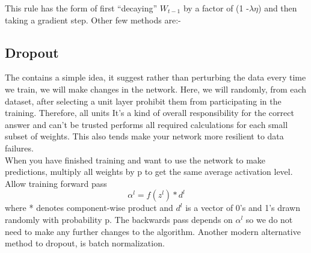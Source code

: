 This rule has the form of first “decaying” $W_{t-1}$ by a factor of (1 -$\lambda \eta$) and then taking a gradient step.
Other few methods are:-



\subsection{Dropout}
The contains a simple idea, it suggest rather than perturbing the data every time we train, we will make changes in the
network. Here, we will randomly, from each dataset, after selecting a unit layer prohibit them from participating  in the training. Therefore, all  units It's a  kind of overall responsibility for  the correct answer  and can't be trusted performs all required calculations for each small subset of weights. This also tends make your network more resilient to data failures\cite{JMLR:v15:srivastava14a}.\\
When you have finished training and want to use the network to make predictions,  multiply all weights by p to get the same average activation level. Allow training forward pass\\
\begin{equation}
    \alpha^l = f(z^l) * d^l
\end{equation}
where * denotes component-wise product and $d^l$ is a vector of 0’s and 1’s drawn randomly
with probability p. The backwards pass depends on $\alpha^l$ so we do not need to make any
further changes to the algorithm.
Another modern alternative method to dropout, is batch normalization.
